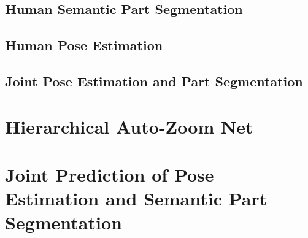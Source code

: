 \subsection{Human Semantic Part Segmentation}

\subsection{Human Pose Estimation}

\subsection{Joint Pose Estimation and Part Segmentation}

\section{Hierarchical Auto-Zoom Net}
\label{sec:hazn}

\section{Joint Prediction of Pose Estimation and Semantic Part Segmentation}
\label{sec:pose_and_seg}

